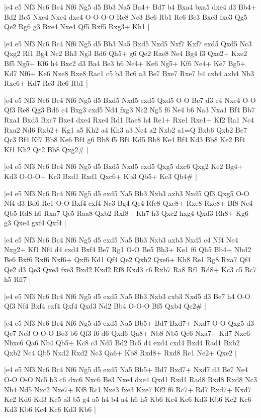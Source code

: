 \whitename{}
\blackname{}
\makegametitle
|e4 e5 Nf3 Nc6 Bc4 Nf6 Ng5 d5 Bb3 Na5 Ba4+ Bd7 b4 Bxa4 bxa5 dxe4 d3 Bb4+ Bd2 Bc5 Nxe4 Nxe4 dxe4 O-O O-O Re8 Nc3 Bc6 Rb1 Re6 Be3 Bxe3 fxe3 Qg5 Qe2 Rg6 g3 Bxe4 Nxe4 Qf5 Rxf5 Rxg3+ Kh1  |

\whitename{}
\blackname{}
\makegametitle
|e4 e5 Nf3 Nc6 Bc4 Nf6 Ng5 d5 Bb3 Na5 Bxd5 Nxd5 Nxf7 Kxf7 exd5 Qxd5 Nc3 Qxg2 Rf1 Bg4 Ne2 Bh3 Ng3 Bd6 Qh5+ g6 Qe2 Rae8 Ne4 Bg4 f3 Qxe2+ Kxe2 Bf5 Ng5+ Kf6 h4 Bxc2 d3 Ba4 Be3 b6 Ne4+ Ke6 Ng5+ Kf6 Ne4+ Ke7 Bg5+ Kd7 Nf6+ Ke6 Nxe8 Rxe8 Rac1 c5 b3 Bc6 a3 Be7 Bxe7 Rxe7 b4 cxb4 axb4 Nb3 Rxc6+ Kd7 Rc3 Re6 Rb1  |

\whitename{}
\blackname{}
\makegametitle
|e4 e5 Nf3 Nc6 Bc4 Nf6 Ng5 d5 Bxd5 Nxd5 exd5 Qxd5 O-O Be7 d3 e4 Nxe4 O-O Qf3 Re8 Qg3 Bd6 c4 Bxg3 cxd5 Nd4 fxg3 Nc2 Ng5 f6 Ne4 b6 Na3 Nxa1 Bf4 Bb7 Rxa1 Bxd5 Bxc7 Bxe4 dxe4 Rxe4 Rd1 Rae8 h4 Re1+ Rxe1 Rxe1+ Kf2 Ra1 Nc4 Rxa2 Nd6 Rxb2+ Kg1 a5 Kh2 a4 Kh3 a3 Nc4 a2 Nxb2 a1=Q Bxb6 Qxb2 Bc7 Qc3 Bf4 Kf7 Bb8 Ke6 Bf4 g6 Bb8 f5 Bf4 Kd5 Bb8 Ke4 Bf4 Kd3 Bb8 Ke2 Bf4 Kf1 Kh2 Qc2 Bb8 Qxg2\#  |

\whitename{}
\blackname{}
\makegametitle
|e4 e5 Nf3 Nc6 Bc4 Nf6 Ng5 d5 Bxd5 Nxd5 exd5 Qxg5 dxc6 Qxg2 Ke2 Bg4+ Kd3 O-O-O+ Kc3 Bxd1 Rxd1 Qxc6+ Kb3 Qb5+ Kc3 Qb4\#  |

\whitename{}
\blackname{}
\makegametitle
|e4 e5 Nf3 Nc6 Bc4 Nf6 Ng5 d5 exd5 Na5 Bb3 Nxb3 axb3 Nxd5 Qf3 Qxg5 O-O Nf4 d3 Bd6 Re1 O-O Bxf4 exf4 Nc3 Bg4 Qe4 Rfe8 Qxe8+ Rxe8 Rxe8+ Bf8 Ne4 Qb5 Rd8 h6 Rxa7 Qe5 Raa8 Qxb2 Rxf8+ Kh7 h3 Qxc2 hxg4 Qxd3 Rh8+ Kg6 g3 Qxe4 gxf4 Qxf4  |

\whitename{}
\blackname{}
\makegametitle
|e4 e5 Nf3 Nc6 Bc4 Nf6 Ng5 d5 exd5 Na5 Bb3 Nxb3 axb3 Nxd5 c4 Nf4 Ne4 Nxg2+ Kf1 Nf4 d4 exd4 Bxf4 Be7 Rg1 O-O Be5 Bh3+ Ke1 f6 Qh5 Bb4+ Nbd2 Be6 Bxf6 Rxf6 Nxf6+ Qxf6 Kd1 Qf4 Qe2 Qxh2 Qxe6+ Kh8 Re1 Rg8 Rxa7 Qf4 Qe2 d3 Qe3 Qxe3 fxe3 Bxd2 Kxd2 Rf8 Kxd3 c6 Rxb7 Ra8 Rf1 Rd8+ Kc3 c5 Rc7 h5 Rff7  |

\whitename{}
\blackname{}
\makegametitle
|e4 e5 Nf3 Nc6 Bc4 Nf6 Ng5 d5 exd5 Na5 Bb3 Nxb3 cxb3 Nxd5 d3 Be7 h4 O-O Qf3 Nf4 Bxf4 exf4 Qxf4 Qxd3 Nd2 Bb4 O-O-O Bf5 Qxb4 Qc2\#  |

\whitename{}
\blackname{}
\makegametitle
|e4 e5 Nf3 Nc6 Bc4 Nf6 Ng5 d5 exd5 Na5 Bb5+ Bd7 Bxd7+ Nxd7 O-O Qxg5 d3 Qe7 Nc3 O-O-O Be3 b6 Qf3 f6 d6 Qxd6 Qa8+ Nb8 Nb5 Qc6 Nxa7+ Kd7 Nxc6 Nbxc6 Qa6 Nb4 Qb5+ Kc8 c3 Nd5 Bd2 Bc5 d4 exd4 cxd4 Bxd4 Rad1 Bxb2 Qxb2 Nc4 Qb5 Nxd2 Rxd2 Nc3 Qa6+ Kb8 Rxd8+ Rxd8 Rc1 Ne2+ Qxe2  |

\whitename{}
\blackname{}
\makegametitle
|e4 e5 Nf3 Nc6 Bc4 Nf6 Ng5 d5 exd5 Na5 Bb5+ Bd7 Bxd7+ Nxd7 d3 Be7 Ne4 O-O O-O Nc5 b3 c6 dxc6 Nxc6 Be3 Nxe4 dxe4 Qxd1 Rxd1 Rad8 Rxd8 Rxd8 Nc3 Nb4 Nd5 Nxc2 Nxe7+ Kf8 Rc1 Nxe3 fxe3 Kxe7 Kf2 f6 Rc7+ Rd7 Rxd7+ Kxd7 Ke2 Kd6 Kd3 Kc5 a3 b5 g4 a5 h4 b4 a4 h6 h5 Kb6 Kc4 Kc6 Kd3 Kb6 Kc2 Kc6 Kd3 Kb6 Kc4 Kc6 Kd3 Kb6  |

